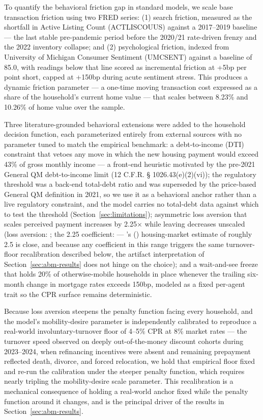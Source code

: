 \documentclass[12pt]{article}
\newcommand{\citepos}[1]{\citeauthor{#1}'s (\citeyear{#1})}
\begin{document}
To quantify the behavioral friction gap in standard models, we scale base transaction friction using two FRED series: (1) search friction, measured as the shortfall in Active Listing Count (ACTLISCOUUS) against a 2017--2019 baseline --- the last stable pre-pandemic period before the 2020/21 rate-driven frenzy and the 2022 inventory collapse; and (2) psychological friction, indexed from University of Michigan Consumer Sentiment (UMCSENT) against a baseline of 85.0, with readings below that line scored as incremental friction at +5bp per point short, capped at +150bp during acute sentiment stress. This produces a dynamic friction parameter --- a one-time moving transaction cost expressed as a share of the household's current home value --- that scales between 8.23\% and 10.26\% of home value over the sample.

Three literature-grounded behavioral extensions were added to the household decision function, each parameterized entirely from external sources with no parameter tuned to match the empirical benchmark: a debt-to-income (DTI) constraint that vetoes any move in which the new housing payment would exceed 43\% of gross monthly income --- a front-end heuristic motivated by the pre-2021 General QM debt-to-income limit (12 C.F.R. \S{} 1026.43(e)(2)(vi)); the regulatory threshold was a back-end total-debt ratio and was superseded by the price-based General QM definition in 2021, so we use it as a behavioral anchor rather than a live regulatory constraint, and the model carries no total-debt data against which to test the threshold (Section~\ref{sec:limitations}); asymmetric loss aversion that scales perceived payment increases by 2.25$\times$ while leaving decreases unscaled (loss aversion: \citealp{kahneman1979}; the 2.25 coefficient: \citealp{tversky1992} --- \citepos{andersen2022} housing-market estimate of roughly 2.5 is close, and because any coefficient in this range triggers the same turnover-floor recalibration described below, the artifact interpretation of Section~\ref{sec:abm-results} does not hinge on the choice); and a wait-and-see freeze that holds 20\% of otherwise-mobile households in place whenever the trailing six-month change in mortgage rates exceeds 150bp, modeled as a fixed per-agent trait so the CPR surface remains deterministic.

Because loss aversion steepens the penalty function facing every household, and the model's mobility-desire parameter is independently calibrated to reproduce a real-world involuntary-turnover floor of 4--5\% CPR at 8\% market rates --- the turnover speed observed on deeply out-of-the-money discount cohorts during 2023--2024, when refinancing incentives were absent and remaining prepayment reflected death, divorce, and forced relocation, we hold that empirical floor fixed and re-run the calibration under the steeper penalty function, which requires nearly tripling the mobility-desire scale parameter. This recalibration is a mechanical consequence of holding a real-world anchor fixed while the penalty function around it changes, and is the principal driver of the results in Section~\ref{sec:abm-results}.
\end{document}

